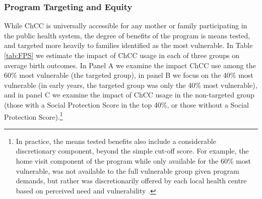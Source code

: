 \documentclass[12pt]{article}
\begin{document}
\begin{spacing}{1.4}
\subsubsection{Program Targeting and Equity}
While ChCC is universally accessible for any mother or family
participating in the public health system, the degree of benefits
of the program is means tested, and targeted more heavily to
families identified as the most vulnerable.  In Table \ref{tab:FPS}
we estimate the impact of ChCC usage in each of three groups on
average birth outcomes.  In Panel A we examine the impact ChCC
use among the 60\% most vulnerable (the targeted group), in panel
B we focus on the 40\% most vulnerable (in early years, the targeted
group was only the 40\% most vulnerable), and in panel C we
examine the impact of ChCC usage in the non-targeted group (those
with a Social Protection Score in the top 40\%, or those without a
Social Protection Score).\footnote{In practice, the means
  tested benefits also include a considerable discretionary
  component, beyond the simple cut-off score.  For example, the
  home visit component of the program while only available for
  the 60\% most vulnerable, was not available to the full
  vulnerable group given program demands, but rather was
  discretionarily offered by each local health centre based
on perceived need and vulnerability \citep{MDS2014}.}


\end{spacing}
\end{document}
